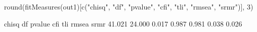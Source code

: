 \begin{Schunk}
\begin{Sinput}
 round(fitMeasures(out1)[c("chisq", "df", "pvalue", "cfi", 
                           "tli", "rmsea", "srmr")], 3)
\end{Sinput}
\begin{Soutput}
 chisq     df pvalue    cfi    tli  rmsea   srmr 
41.021 24.000  0.017  0.987  0.981  0.038  0.026 
\end{Soutput}
\end{Schunk}
